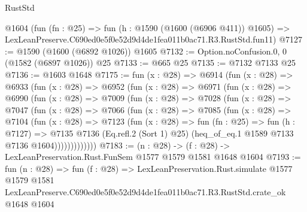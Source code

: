 \begin{lexlean}{RustStd}
\begin{coremodule}
    @1604
    (fun (fn : @25) =>
    fun (h : @1590 (@1600 (@6906 @411)) @1605) =>
    LexLeanPreserve.C690ed0e5f0e52d9d4de1fea011b0ac71.R3.RustStd.fun11)
@7127 := @1590 (@1600 (@6892 @1026)) @1605
@7132 := Option.noConfusion.{0, 0} (@1582 (@6897 @1026)) @25
@7133 := @665 @25
@7135 := @7132 @7133 @25
@7136 := @1603 @1648
@7175 := fun (x : @28) =>
  @6914
    (fun (x : @28) =>
    @6933
      (fun (x : @28) =>
      @6952
        (fun (x : @28) =>
        @6971
          (fun (x : @28) =>
          @6990
            (fun (x : @28) =>
            @7009
              (fun (x : @28) =>
              @7028
                (fun (x : @28) =>
                @7047
                  (fun (x : @28) =>
                  @7066
                    (fun (x : @28) =>
                    @7085
                      (fun (x : @28) =>
                      @7104
                        (fun (x : @28) =>
                        @7123
                          (fun (x : @28) =>
                          fun (fn : @25) =>
                          fun (h : @7127) =>
                          @7135
                            @7136
                            (Eq.refl.{2} (Sort 1) @25)
                            (heq_of_eq.{1} @1589 @7133 @7136 @1604)))))))))))))
@7183 := (n : @28) -> (f : @28) -> LexLeanPreservation.Rust.FunSem @1577 @1579 @1581 @1648 @1604
@7193 := fun (n : @28) =>
  fun (f : @28) =>
  LexLeanPreservation.Rust.simulate
    @1577
    @1579
    @1581
    LexLeanPreserve.C690ed0e5f0e52d9d4de1fea011b0ac71.R3.RustStd.crate_ok
    @1648
    @1604
\end{coremodule}
\end{lexlean}
